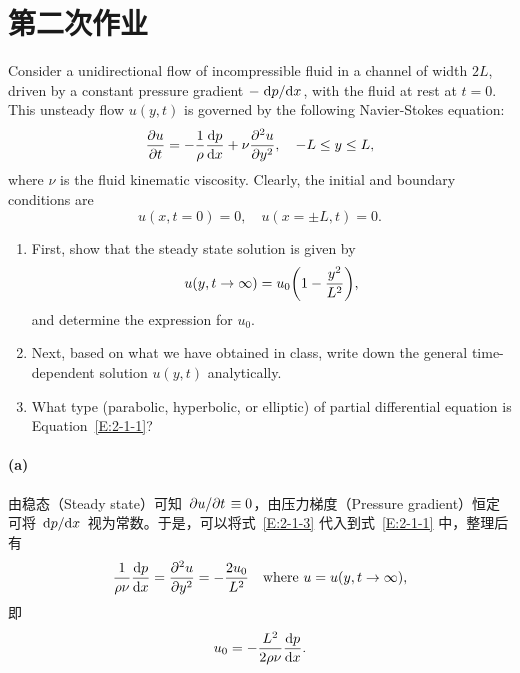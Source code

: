 \section{第二次作业}

\begin{homework}[label={H:2-1}]
    Consider a unidirectional flow of incompressible fluid in a channel of width $2L$, driven by a constant pressure gradient $-\dv*{p}{x}$, with the fluid at rest at $t=0$. This unsteady flow $u(y, t)$ is governed by the following Navier-Stokes equation:
    \begin{equation}\label{E:2-1-1}
        \pdv{u}{t} = -\frac{1}{\rho}\dv{p}{x} + \nu\pdv[2]{u}{y},
        \quad
        -L\leq y\leq L,
    \end{equation}
    where $\nu$ is the fluid kinematic viscosity. Clearly, the initial and boundary conditions are
    \begin{equation}\label{E:2-1-2}
        u(x, t=0) = 0,
        \quad
        u(x=\pm L, t) = 0.
    \end{equation}

    \begin{enumerate}[label=(\alph*)]
        \item First, show that the steady state solution is given by
            \begin{equation}\label{E:2-1-3}
                u(y, t\to\infty) = u_0\qty(1-\frac{y^2}{L^2}),
            \end{equation}
            and determine the expression for $u_0$.
        \item Next, based on what we have obtained in class, write down the general time-dependent solution $u(y, t)$ analytically.
        \item What type (parabolic, hyperbolic, or elliptic) of partial differential equation is Equation~\eqref{E:2-1-1}?
    \end{enumerate}
\end{homework}

\paragraph{(a)}
由稳态（Steady state）可知 $\pdv*{u}{t}\equiv 0$，由压力梯度（Pressure gradient）恒定可将 $\dv*{p}{x}$ 视为常数。于是，可以将式~\eqref{E:2-1-3} 代入到式~\eqref{E:2-1-1} 中，整理后有
\begin{equation*}
    \frac{1}{\rho\nu}\dv{p}{x} = \pdv[2]{u}{y} = -\frac{2u_0}{L^2}
    \quad
    \text{where } u=u(y, t\to\infty),
\end{equation*}
即
\begin{equation*}
    u_0 = -\frac{L^2}{2\rho\nu}\dv{p}{x}.
\end{equation*}

